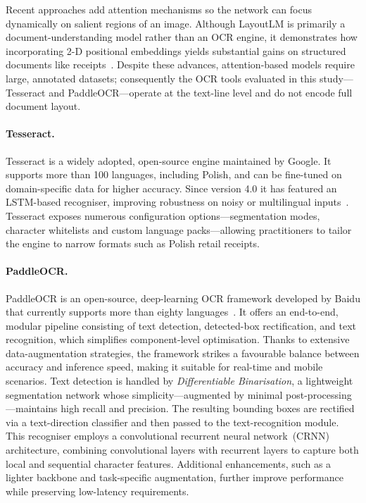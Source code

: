\documentclass{SGGW-thesis-EN}
\begin{document}
Recent approaches add attention mechanisms so the network can focus dynamically on
salient regions of an image.
Although LayoutLM is primarily a document-understanding model rather than an OCR engine,
it demonstrates how incorporating 2-D positional embeddings yields substantial gains on
structured documents like receipts~\cite{li2020layoutlm}.
Despite these advances, attention-based models require large, annotated datasets;
consequently the OCR tools evaluated in this study—Tesseract and PaddleOCR—operate at the
text-line level and do not encode full document layout.

\paragraph{Tesseract.}

Tesseract is a widely adopted, open-source engine maintained by Google.
It supports more than 100 languages, including Polish, and can be fine-tuned on
domain-specific data for higher accuracy.
Since version 4.0 it has featured an LSTM-based recogniser, improving robustness on
noisy or multilingual inputs~\cite{smith2007overview,smith2013history}.
Tesseract exposes numerous configuration options—segmentation modes, character
whitelists and custom language packs—allowing practitioners to tailor the engine to
narrow formats such as Polish retail receipts.

\paragraph{PaddleOCR.}

PaddleOCR is an open-source, deep-learning OCR framework developed by Baidu that currently
supports more than eighty languages~\cite{du2020ppocr}.
It offers an end-to-end, modular pipeline consisting of text detection, detected-box
rectification, and text recognition, which simplifies component-level optimisation.
Thanks to extensive data-augmentation strategies, the framework strikes a favourable
balance between accuracy and inference speed, making it suitable for real-time and
mobile scenarios.
Text detection is handled by \textit{Differentiable Binarisation}, a lightweight
segmentation network whose simplicity—augmented by minimal post-processing—maintains
high recall and precision.
The resulting bounding boxes are rectified via a text-direction classifier and then
passed to the text-recognition module.
This recogniser employs a convolutional recurrent neural network~(CRNN) architecture,
combining convolutional layers with recurrent layers to capture both local and
sequential character features.
Additional enhancements, such as a lighter backbone and task-specific augmentation,
further improve performance while preserving low-latency requirements.
\end{document}
